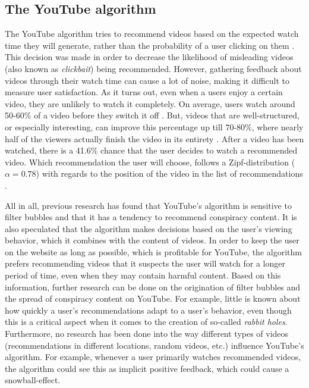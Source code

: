 \documentclass[../main.tex]{subfiles}
\begin{document}
\subsection{The YouTube algorithm}
The YouTube algorithm tries to recommend videos based on the expected watch time they will generate,
rather than the probability of a user clicking on them \citep{covington2016deep}. This decision was made
in order to decrease the likelihood of misleading videos (also known as \textit{clickbait}) being
recommended. However, gathering feedback about videos through their watch time can cause a lot of noise,
making it difficult to measure user satisfaction. As it turns out, even when a users enjoy a certain
video, they are unlikely to watch it completely. On average, users watch around 50-60\% of a video
before they switch it off \citep{park2016data}. But, videos that are well-structured, or especially
interesting, can improve this percentage up till 70-80\%, where nearly half of the viewers actually
finish the video in its entirety \citep{lang_2018}. After a video has been watched, there is a 41.6\%
chance that the user decides to watch a recommended video. Which recommendation the user will choose,
follows a Zipf-distribution ($\alpha = 0.78$) with regards to the position of the video in the list of
recommendations \citep{zhou2010impact}. 

All in all, previous research has found that YouTube's algorithm is sensitive to filter bubbles and that
it has a tendency to recommend conspiracy content. It is also speculated that the algorithm makes
decisions based on the user's viewing behavior, which it combines with the content of videos. In order
to keep the user on the website as long as possible, which is profitable for YouTube, the algorithm
prefers recommending videos that it suspects the user will watch for a longer period of time, even when
they may contain harmful content. Based on this information, further research can be done on the
origination of filter bubbles and the spread of conspiracy content on YouTube. For example, little is
known about how quickly a user's recommendations adapt to a user's behavior, even though this is a
critical aspect when it comes to the creation of so-called \textit{rabbit holes}. Furthermore, no
research has been done into the way different types of videos (recommendations in different locations,
random videos, etc.) influence YouTube's algorithm. For example, whenever a user primarily watches
recommended videos, the algorithm could see this as implicit positive feedback, which could cause a
snowball-effect. 
\end{document}
